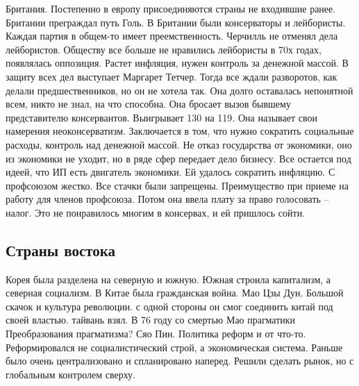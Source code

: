 \documentclass[a4paper, 12pt]{article}
\begin{document}
\begin{multicols}{2}
Британия. Постепенно в европу присоединяются страны не входившие ранее. Британии преграждал путь Голь. В Британии были консерваторы и лейбористы. Каждая партия в общем-то имеет преемственность. Черчилль не отменял дела лейбористов. Обществу все больше не нравились лейбористы в 70х годах, появлялась оппозиция. Растет инфляция, нужен контроль за денежной массой. В защиту всех дел выступает Маргарет Тетчер. Тогда все ждали разворотов, как делали предшественников, но он не хотела так. Она долго оставалась непонятной всем, никто не знал, на что способна. Она бросает вызов бывшему представителю консервантов. Выигрывает 130 на 119. Она называет свои намерения неоконсерватизм. Заключается в том, что нужно сократить социальные расходы, контроль над денежной массой. Не отказ государства от экономики, оно из экономики не уходит, но в ряде сфер передает дело бизнесу. Все остается под идеей, что ИП есть двигатель экономики. Ей удалось сократить инфляцию. С профсоюзом жестко. Все стачки были запрещены. Преимущество при приеме на работу для членов профсоюза. Потом она ввела плату за право голосовать -- налог. Это не понравилось многим в консервах, и ей пришлось сойти. 


\subsection{Страны востока}
Корея была разделена на северную и южную. Южная строила капитализм, а северная социализм. В Китае была гражданская война. Мао Цзы Дун. Большой скачок и культура революции. с одной стороны он смог соединить китай под своей властью. тайвань взял. В 76 году со смертью Мао прагматики Преобразования прагматизма? Сяо Пин. Политика реформ и от что-то. Реформировался не социалистический строй, а экономическая система. Раньше было очень централизовано и спланировано наперед. Решили сделать рынок,  но с глобальным контролем сверху. 




















































\end{multicols}
\end{document}
